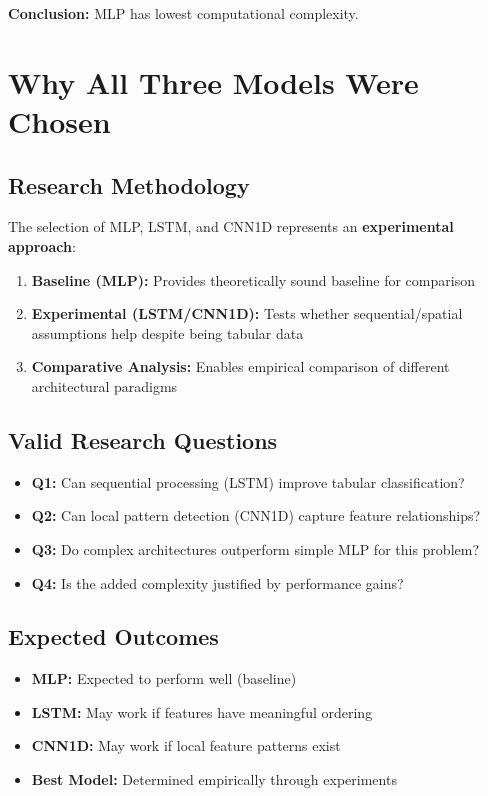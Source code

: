 \documentclass[12pt]{article}
\begin{document}
\textbf{Conclusion:} MLP has lowest computational complexity.

\section{Why All Three Models Were Chosen}

\subsection{Research Methodology}

The selection of MLP, LSTM, and CNN1D represents an \textbf{experimental approach}:

\begin{enumerate}
    \item \textbf{Baseline (MLP):} Provides theoretically sound baseline for comparison
    \item \textbf{Experimental (LSTM/CNN1D):} Tests whether sequential/spatial assumptions help despite being tabular data
    \item \textbf{Comparative Analysis:} Enables empirical comparison of different architectural paradigms
\end{enumerate}

\subsection{Valid Research Questions}

\begin{itemize}
    \item \textbf{Q1:} Can sequential processing (LSTM) improve tabular classification?
    \item \textbf{Q2:} Can local pattern detection (CNN1D) capture feature relationships?
    \item \textbf{Q3:} Do complex architectures outperform simple MLP for this problem?
    \item \textbf{Q4:} Is the added complexity justified by performance gains?
\end{itemize}

\subsection{Expected Outcomes}

\begin{itemize}
    \item \textbf{MLP:} Expected to perform well (baseline)
    \item \textbf{LSTM:} May work if features have meaningful ordering
    \item \textbf{CNN1D:} May work if local feature patterns exist
    \item \textbf{Best Model:} Determined empirically through experiments
\end{itemize}
\end{document}
